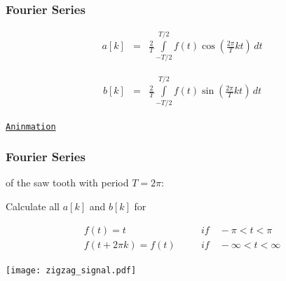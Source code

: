 \begin{frame}
    \frametitle{Fourier Series}

    \begin{eqnarray*}
        a[k] &=& \frac{2}{T} \int\limits_{-T/2}^{T/2} f(t) \cos \left(\frac{2\pi}{T}kt\right) \, dt
    \end{eqnarray*}

    \begin{eqnarray*}
        b[k] &=& \frac{2}{T} \int\limits_{-T/2}^{T/2} f(t) \sin \left(\frac{2\pi}{T}kt\right) \, dt
    \end{eqnarray*}


    \begin{flushright}
        \href{https://upload.wikimedia.org/wikipedia/commons/5/50/Fourier_transform_time_and_frequency_domains.gif}{\texttt{Aninmation}}
    \end{flushright}

\end{frame}



\begin{frame}
    \frametitle{Fourier Series}

    \myExample of the saw tooth with period $T=2\pi$:\newline

    Calculate all $a[k]$ and $b[k]$ for

    \begin{eqnarray*}
        f(t) = t &\quad& if \quad -\pi < t < \pi\\
        f(t + 2\pi k) = f(t) &\quad& if \quad -\infty < t < \infty
    \end{eqnarray*}

    \begin{center}
        \texttt{[image: zigzag\_signal.pdf]}
    \end{center}

\end{frame}




